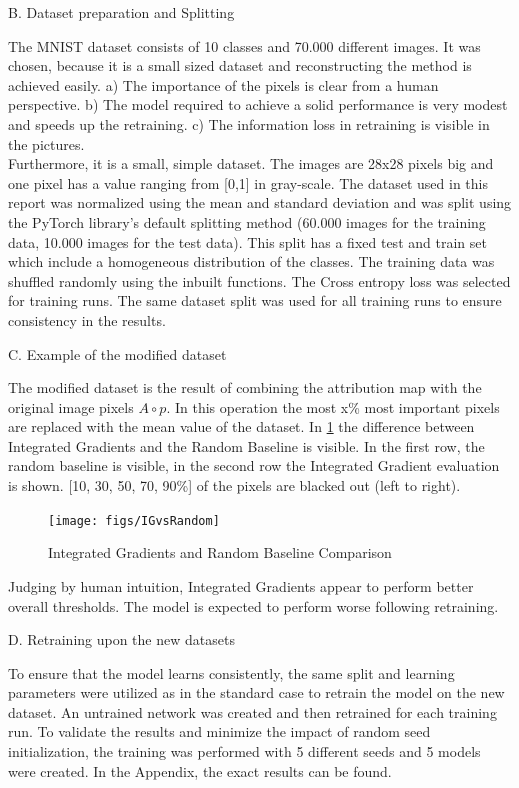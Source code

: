 B. Dataset preparation and Splitting

The MNIST dataset consists of 10 classes and 70.000 different images. It was chosen, because it is a small sized dataset and reconstructing the method is achieved easily. a) The importance of the pixels is clear from a human perspective. b) The model required to achieve a solid performance is very modest and speeds up the retraining. c) The information loss in retraining is visible in the pictures.\\

Furthermore, it is a small, simple dataset. The images are 28x28 pixels big and one pixel has a value ranging from [0,1] in gray-scale. The dataset used in this report was normalized using the mean and standard deviation and was split using the PyTorch library’s default splitting method (60.000 images for the training data, 10.000 images for the test data). This split has a fixed test and train set which include a homogeneous distribution of the classes. The training data was shuffled randomly using the inbuilt functions. The Cross entropy loss was selected for training runs. The same dataset split was used for all training runs to ensure consistency in the results.

C. Example of the modified dataset

The modified dataset is the result of combining the attribution map with the original image pixels $A \circ p$. In this operation the most x\% most important pixels are replaced with the mean value of the dataset.
In \ref{fig:IGvsRandom} the difference between Integrated Gradients and the Random Baseline is visible. In the first row, the random baseline is visible, in the second row the Integrated Gradient evaluation is shown. [10, 30, 50, 70, 90\%] of the pixels are blacked out (left to right).

\begin{figure}[h!]
	\centering
	\texttt{[image: figs/IGvsRandom]}
	\caption{Integrated Gradients and Random Baseline Comparison}
	\label{fig:IGvsRandom}
\end{figure}

Judging by human intuition, Integrated Gradients appear to perform better overall thresholds. The model is expected to perform worse following retraining.

D. Retraining upon the new datasets

To ensure that the model learns consistently, the same split and learning parameters were utilized as in the standard case to retrain the model on the new dataset. An untrained network was created and then retrained for each training run. To validate the results and minimize the impact of random seed initialization, the training was performed with 5 different seeds and 5 models were created. In the Appendix, the exact results can be found.

